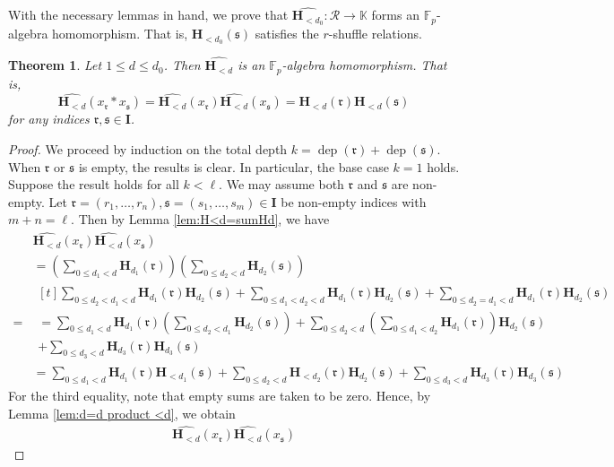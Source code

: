 \documentclass[12pt,reqno]{amsart}
\numberwithin{equation}{section}
\theoremstyle{plain}
\newtheorem{thm}{Theorem}[section]
\theoremstyle{definition}
\theoremstyle{remark}
\newcommand{\FF}{\mathbb{F}}
\newcommand{\KK}{\mathbb{K}}
\newcommand{\Rcal}{\mathcal{R}}
\newcommand{\dep}{\operatorname{dep}}
\newcommand{\ww}[1]{\mathfrak{#1}}
\renewcommand{\H}{\mathbf{H}}
\newcommand{\Ical}{\mathbf{I}}
\begin{document}
With the necessary lemmas in hand, we prove that $\widehat{\H_{<d_0}}:\Rcal\to\KK$ forms an $\FF_p$-algebra homomorphism. That is, ${\H_{<d_0}}(\ww{s})$ satisfies the $r$-shuffle relations.
\begin{thm}\label{thm:abstract-r-shuffle}
    Let $1\leq d\leq d_0$. Then $\widehat{\H_{<d}}$ is an $\FF_p$-algebra homomorphism. That is, 
    $$\widehat{\H_{<d}}(x_{\ww{r}}\ast x_{\ww{s}})=\widehat{\H_{<d}}(x_{\ww{r}})\widehat{\H_{<d}}(x_{\ww{s}})=\H_{<d}(\ww{r})\H_{<d}(\ww{s})$$
    for any indices $\ww{r},\ww{s}\in\Ical$.
\end{thm}
\begin{proof}
     We proceed by induction on the total depth $k=\dep(\ww{r})+\dep(\ww{s})$. When $\ww{r}$ or $\ww{s}$ is empty, the results is clear. In particular, the base case $k=1$ holds. Suppose the result holds for all $k<\ell$. We may assume both $\ww{r}$ and $\ww{s}$ are non-empty.  Let 
    $\ww{r}=(r_1,\ldots,r_n),\ww{s}=(s_1,\ldots,s_m)\in\Ical$ be non-empty indices
    with $m+n=\ell$.
    Then by Lemma \ref{lem:H<d=sumHd}, we have
    \begin{align*}
        &\widehat{\H_{<d}}(x_{\ww{r}})\widehat{\H_{<d}}(x_{\ww{s}})\\
        &=\left(\sum_{0\leq d_1<d}\H_{d_1}(\ww{r})\right)\left(\sum_{0\leq d_2<d}\H_{d_2}(\ww{s})\right)
        \\
        ={} &\begin{multlined}[t]
        \sum_{0\leq d_2<d_1<d}\H_{d_1}(\ww{r})\H_{d_2}(\ww{s})+\sum_{0\leq d_1<d_2<d}\H_{d_1}(\ww{r})\H_{d_2}(\ww{s})+\sum_{0\leq d_2=d_1<d}\H_{d_1}(\ww{r})\H_{d_2}(\ww{s})\\
        =\sum_{0\leq d_1<d}\H_{d_1}(\ww{r})\left(\sum_{0\leq d_2<d_1}\H_{d_2}(\ww{s})\right)+\sum_{0\leq d_2<d}\left(\sum_{0\leq d_1<d_2}\H_{d_1}(\ww{r})\right)\H_{d_2}(\ww{s})  
            \\+ \sum_{0\leq d_3<d}\H_{d_3}(\ww{r})\H_{d_3}(\ww{s})
        \end{multlined}\\
        &=\sum_{0\leq d_1<d}\H_{d_1}(\ww{r})\H_{<d_1}(\ww{s})+\sum_{0\leq d_2<d}\H_{<d_2}(\ww{r})\H_{d_2}(\ww{s})  
            + \sum_{0\leq d_3<d}\H_{d_3}(\ww{r})\H_{d_3}(\ww{s})
    \end{align*}
    For the third equality, note that empty sums are taken to be zero.
    Hence, by Lemma \ref{lem:d=d product <d}, we obtain
    \begin{multline}\label{eq:shuffle2}
\widehat{\H_{<d}}(x_{\ww{r}})\widehat{\H_{<d}}(x_{\ww{s}})

\end{multline}
\end{proof}
\end{document}
